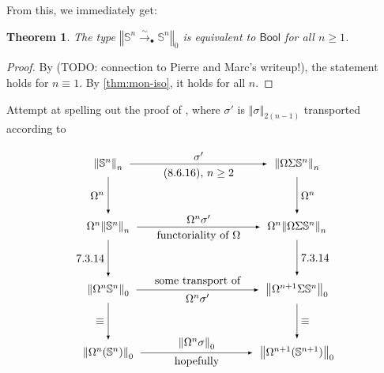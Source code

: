 \documentclass[11pt,a4paper,oneside,reqno]{amsart}
\newtheorem{theorem}{Theorem}
\theoremstyle{definition}
\theoremstyle{remark}
\newcommand{\sph}[1]{{\mathbb S}^{#1}}
\newcommand{\trunc}[2]{\mathopen{}\left\Vert #2\right\Vert_{#1}\mathclose{}}
\begin{document}
From this, we immediately get:

\begin{theorem} \label{thm:Sn-bool}
 The type
 $\trunc 0 {\sph n \xrightarrow{\sim}_\bullet \sph n}$
is equivalent to $\mathsf{Bool}$ for all $n \geq 1$.
\end{theorem}
\begin{proof}
 By (TODO: connection to Pierre and Marc's writeup!), the statement holds for $n \equiv 1$.
 By \cref{thm:mon-iso}, it holds for all $n$.
\end{proof}


Attempt at spelling out the proof of \cite[8.6.15]{HoTT},
where $\sigma'$ is $\trunc {2(n-1)} \sigma$ transported according to 
\cite[7.3.15]{HoTT}


\begin{equation} \label{eq:wants-to-commute}
\begin{tikzpicture}[x=6cm,y=-2cm,baseline=(current bounding box.center)]
 \tikzset{arrow/.style={shorten >=0.1cm,shorten <=.1cm,-latex}}

 \node (UL) at (0,0) {$\trunc n {\sph n}$};
 \node (UR) at (1,0) {$\trunc n {\Omega\Sigma \sph n}$};
 \node (mL) at (0,1) {$\Omega^n \trunc n {\sph n}$};
 \node (mR) at (1,1) {$\Omega^n \trunc n {\Omega\Sigma \sph n}$};
 

 \draw[arrow] (UL) to node [above] {$\sigma'$} 
                      node [below] {(8.6.16), $n\geq 2$} (UR);
 \draw[arrow] (UL) to node [left] {$\Omega^n$} (mL);
 \draw[arrow] (UR) to node [right] {$\Omega^n$} (mR);
 \draw[arrow] (mL) to node [above] {$\Omega^n \sigma'$} node [below] {functoriality of $\Omega$} (mR);


 \node (ML) at (0,2) {$\trunc 0 {\Omega^n \sph n}$};
 \node (MR) at (1,2) {$\trunc 0 {\Omega^{n+1}\Sigma \sph n}$}; 
 \draw[arrow] (mL) to node [left] {7.3.14} (ML);
 \draw[arrow] (mR) to node [right] {7.3.14} (MR);
 \draw[arrow] (ML) to node [below] {$\Omega^n \sigma'$} node [above] {some transport of} (MR);

 \node (DL) at (0,3) {$\trunc 0 {\Omega^n(\sph n)}$}; 
 \node (DR) at (1,3) {$\trunc 0 {\Omega^{n+1}(\sph {n+1})}$}; 
 \draw[arrow] (ML) to node [left] {$\equiv$} (DL);
 \draw[arrow] (MR) to node [right] {$\equiv$} (DR); 
 \draw[arrow] (DL) to node [above] {$\trunc 0 {\Omega^n \sigma}$} node [below] {hopefully} (DR);

\end{tikzpicture}
\end{equation}
\end{document}
